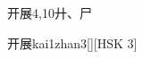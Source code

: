 \begin{entry}{开展}{4,10}{⼶、⼫}
  \begin{phonetics}{开展}{kai1zhan3}[][HSK 3]
  \end{phonetics}
\end{entry}
